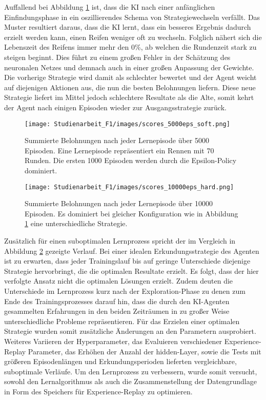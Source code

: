 Auffallend bei Abbildung \ref{fig:AI_initially_trained_soft} ist, dass die KI nach einer anfänglichen Einfindungsphase in ein oszillierendes Schema von Strategiewechseln verfällt. Das Muster resultiert daraus, dass die KI lernt, dass ein besseres Ergebnis dadurch erzielt werden kann, einen Reifen weniger oft zu wechseln. Folglich nähert sich die Lebenszeit des Reifens immer mehr den 0\%, ab welchen die Rundenzeit stark zu steigen beginnt. Dies führt zu einem großen Fehler in der Schätzung des neuronalen Netzes und demnach auch in einer großen Anpassung der Gewichte. Die vorherige Strategie wird damit als schlechter bewertet und der Agent weicht auf diejenigen Aktionen aus, die nun die besten Belohnungen liefern. Diese neue Strategie liefert im Mittel jedoch schlechtere Resultate als die Alte, somit kehrt der Agent nach einigen Episoden wieder zur Ausgangsstrategie zurück.
\begin{figure}
\begin{center}
    \texttt{[image: Studienarbeit\_F1/images/scores\_5000eps\_soft.png]}
    \caption{Summierte Belohnungen nach jeder Lernepisode über 5000 Episoden. Eine Lernepisode repräsentiert ein Rennen mit 70 Runden. Die ersten 1000 Episoden werden durch die Epsilon-Policy dominiert.}
    \label{fig:AI_initially_trained_soft}
\end{center}
\end{figure}
\begin{figure}
    \centering
    \texttt{[image: Studienarbeit\_F1/images/scores\_10000eps\_hard.png]}
    \caption{Summierte Belohnungen nach jeder Lernepisode über 10000 Episoden. Es dominiert bei gleicher Konfiguration wie in Abbildung \ref{fig:AI_initially_trained_soft} eine unterschiedliche Strategie.}
    \label{fig:AI_initially_trained_hard}
\end{figure}
Zusätzlich für einen suboptimalen Lernprozess spricht der im Vergleich in Abbildung \ref{fig:AI_initially_trained_hard} gezeigte Verlauf. Bei einer idealen Erkundungsstrategie des Agenten ist zu erwarten, dass jeder Trainingslauf bis auf geringe Unterschiede diejenige Strategie hervorbringt, die die optimalen Resultate erzielt. Es folgt, dass der hier verfolgte Ansatz nicht die optimalen Lösungen erzielt. Zudem deuten die Unterschiede im Lernprozess kurz nach der Exploration-Phase zu denen zum Ende des Trainingsprozesses darauf hin, dass die durch den KI-Agenten gesammelten Erfahrungen in den beiden Zeiträumen in zu großer Weise unterschiedliche Probleme repräsentieren. Für das Erzielen einer optimalen Strategie wurden somit zusätzliche Änderungen an den Parametern ausprobiert. Weiteres Variieren der Hyperparameter, das Evaluieren verschiedener Experience-Replay Parameter, das Erhöhen der Anzahl der hidden-Layer, sowie die Tests mit größeren Episodenlängen und Erkundungsperioden lieferten vergleichbare, suboptimale Verläufe. Um den Lernprozess zu verbessern, wurde somit versucht, sowohl den Lernalgorithmus als auch die Zusammenstellung der Datengrundlage in Form des Speichers für Experience-Replay zu optimieren.
